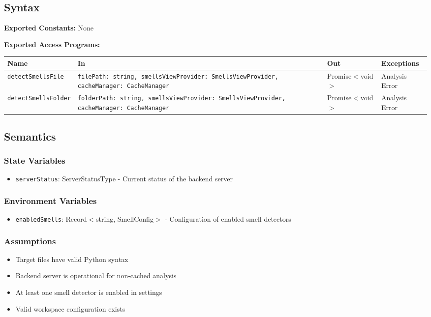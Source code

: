 \documentclass[12pt, titlepage]{article}
\begin{document}
\subsection{Syntax}

\textbf{Exported Constants:} None

\textbf{Exported Access Programs:}\\
\begin{tabularx}{\linewidth}{|l|>{\raggedright\arraybackslash}X|l|l|}
  \hline
  \textbf{Name} & \textbf{In} & \textbf{Out} & \textbf{Exceptions} \\
  \hline
  \texttt{detectSmellsFile} & \texttt{filePath: string, smellsViewProvider: SmellsViewProvider, cacheManager: CacheManager} & Promise$<$void$>$ & Analysis Error \\
  \hline
  \texttt{detectSmellsFolder} & \texttt{folderPath: string, smellsViewProvider: SmellsViewProvider, cacheManager: CacheManager} & Promise$<$void$>$ & Analysis Error \\
  \hline
\end{tabularx}

\subsection{Semantics}

\subsubsection{State Variables}
\begin{itemize}
\item \texttt{serverStatus}: ServerStatusType - Current status of the backend server
\end{itemize}

\subsubsection{Environment Variables}
\begin{itemize}
\item \texttt{enabledSmells}: Record$<$string, SmellConfig$>$ - Configuration of enabled smell detectors
\end{itemize}

\subsubsection{Assumptions}
\begin{itemize}
\item Target files have valid Python syntax
\item Backend server is operational for non-cached analysis
\item At least one smell detector is enabled in settings
\item Valid workspace configuration exists
\end{itemize}
\end{document}
